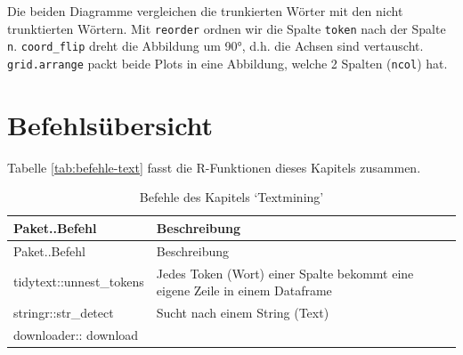 \documentclass[12pt,ngerman,]{book}
\begin{document}
Die beiden Diagramme vergleichen die trunkierten Wörter mit den nicht
trunktierten Wörtern. Mit \texttt{reorder} ordnen wir die Spalte
\texttt{token} nach der Spalte \texttt{n}. \texttt{coord\_flip} dreht
die Abbildung um 90°, d.h. die Achsen sind vertauscht.
\texttt{grid.arrange} packt beide Plots in eine Abbildung, welche 2
Spalten (\texttt{ncol}) hat.

\section{Befehlsübersicht}\label{befehlsubersicht}

Tabelle \ref{tab:befehle-text} fasst die R-Funktionen dieses Kapitels
zusammen.

\begin{longtable}[]{@{}ll@{}}
\caption{Befehle des Kapitels `Textmining'}\tabularnewline
\toprule
\begin{minipage}[b]{0.34\columnwidth}\raggedright\strut
Paket..Befehl\strut
\end{minipage} & \begin{minipage}[b]{0.42\columnwidth}\raggedright\strut
Beschreibung\strut
\end{minipage}\tabularnewline
\midrule
\endfirsthead
\toprule
\begin{minipage}[b]{0.34\columnwidth}\raggedright\strut
Paket..Befehl\strut
\end{minipage} & \begin{minipage}[b]{0.42\columnwidth}\raggedright\strut
Beschreibung\strut
\end{minipage}\tabularnewline
\midrule
\endhead
\begin{minipage}[t]{0.34\columnwidth}\raggedright\strut
tidytext::unnest\_tokens\strut
\end{minipage} & \begin{minipage}[t]{0.42\columnwidth}\raggedright\strut
Jedes Token (Wort) einer Spalte bekommt eine eigene Zeile in einem
Dataframe\strut
\end{minipage}\tabularnewline
\begin{minipage}[t]{0.34\columnwidth}\raggedright\strut
stringr::str\_detect\strut
\end{minipage} & \begin{minipage}[t]{0.42\columnwidth}\raggedright\strut
Sucht nach einem String (Text)\strut
\end{minipage}\tabularnewline
\begin{minipage}[t]{0.34\columnwidth}\raggedright\strut
downloader:: download\strut

\end{minipage}
\end{longtable}
\end{document}
